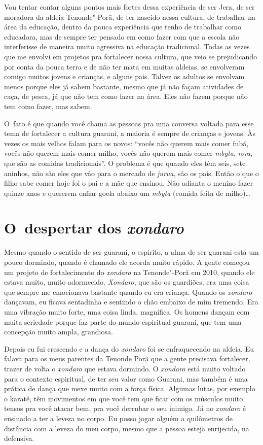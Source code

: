 Vou tentar contar alguns pontos mais fortes dessa experiência de ser
Jera, de ser moradora da aldeia Tenonde"-Porã, de ter nascido nessa
cultura, de trabalhar na área da educação, dentro da pouca experiência
que tenho de trabalhar como educadora, mas de sempre ter pensado em como
fazer com que a escola não interferisse de maneira muito agressiva na
educação tradicional. Todas as vezes que me envolvi em projetos pra
fortalecer nossa cultura, que veio se prejudicando por conta da pouca
terra e de não ter mata em muitas aldeias, se envolveram comigo muitos
jovens e crianças, e alguns pais. Talvez os adultos se envolvam menos
porque eles já sabem bastante, mesmo que já não façam atividades de
caça, de pesca, já que não tem como fazer na área. Eles não fazem
porque não tem como fazer, mas sabem.

O~fato é que quando você chama as pessoas pra uma conversa voltada para
esse tema de fortalecer a cultura guarani, a maioria é sempre de
crianças e jovens. Às vezes os mais velhos falam para os novos: ``vocês
não querem mais comer fubá, vocês não querem mais comer milho, vocês
não querem mais comer \emph{mbyta}, \emph{rora}, que são as comidas tradicionais''. O
problema é que quando eles têm seis, sete aninhos, não são eles que vão
para o mercado de \emph{jurua}, são os pais. Então o que o filho sabe comer
hoje foi o pai e a mãe que ensinou. Não adianta o menino fazer quinze
anos e quererem enfiar goela abaixo um \emph{mbyta} (comida feita de milho)\ldots{}

\section{O~despertar dos \emph{xondaro}}

Mesmo quando o sentido de ser guarani, o espírito, a alma de ser guarani
está um pouco dormindo, quando é chamado ele acorda muito rápido. A
gente começou um projeto de fortalecimento do \emph{xondaro} na Tenonde"-Porã
em 2010, quando ele estava muito, muito adormecido. \emph{Xondaro}, que são os
guardiões, era uma coisa que sempre me emocionava bastante quando eu
era criança. Quando os \emph{xondaro} dançavam, eu ficava sentadinha e
sentindo o chão embaixo de mim tremendo. Era uma vibração muito forte,
uma coisa linda, magnífica. Os homens dançam com muita seriedade porque
faz parte do mundo espiritual guarani, que tem uma concepção muito
ampla, grandiosa.

Depois eu fui crescendo e a dança do \emph{xondaro} foi se enfraquecendo na
aldeia. Eu falava para os meus parentes da Tenonde Porã que a gente
precisava fortalecer, trazer de volta o \emph{xondaro} que estava dormindo. O
\emph{xondaro} está muito voltado para o contexto espiritual, de ter seu valor
como Guarani, mas também é uma prática de dança que mexe muito com a
força física. Algumas lutas, por exemplo o karatê, têm movimentos em
que você tem que ficar com os músculos muito tensos pra você atacar
bem, pra você derrubar o seu inimigo. Já no \emph{xondaro} é ensinado a ter a
leveza no corpo. Eu posso jogar alguém a quilômetros de distância com a
leveza do meu corpo, mesmo que a pessoa esteja enrijecida, na
defensiva.

